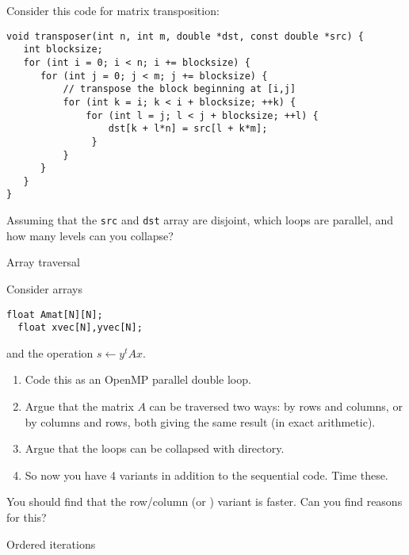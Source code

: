 \begin{exercise}
  Consider this code for matrix transposition:
\begin{lstlisting}[language=omp]
void transposer(int n, int m, double *dst, const double *src) {
   int blocksize;
   for (int i = 0; i < n; i += blocksize) {
      for (int j = 0; j < m; j += blocksize) {
          // transpose the block beginning at [i,j]
          for (int k = i; k < i + blocksize; ++k) {
              for (int l = j; l < j + blocksize; ++l) {
                  dst[k + l*n] = src[l + k*m];
               }
          }
      }
   }
}  
\end{lstlisting}
Assuming that the \lstinline{src} and \lstinline{dst}
array are disjoint, which loops are parallel, and how many
levels can you collapse?
\end{exercise}

 {Array traversal}
\label{sec:omp-row-col-major}

Consider arrays 
\begin{lstlisting}[language=omp]
  float Amat[N][N];
  float xvec[N],yvec[N];  
\end{lstlisting}
and the operation $s\leftarrow y^tAx$.

\begin{enumerate}
\item Code this as an OpenMP parallel double loop.
\item Argue that the matrix $A$ can be traversed two ways:
  by rows and columns, or by columns and rows, both
  giving the same result (in exact arithmetic).
\item Argue that the loops can be collapsed with 
  directory.
\item So now you have 4 variants in addition to the sequential code.
  Time these.
\end{enumerate}

You should find that the row/column (or ) variant
is faster. Can you find reasons for this?



 {Ordered iterations}
\label{sec:omp-ordered}

